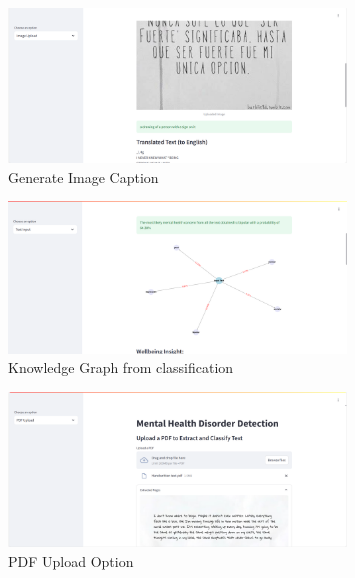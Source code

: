 \begin{figure}[h!]  
    \centering
    \includegraphics[width=0.8\textwidth]{App Images/18 Interface.png}  
    \caption{Generate Image Caption}
    \label{10i234}  %
\end{figure}   

\begin{figure}[h!]  
    \centering
    \includegraphics[width=0.8\textwidth]{App Images/19 Interface.png}  
    \caption{Knowledge Graph from classification}
    \label{10i23445}  %
\end{figure}  

\pagebreak

\begin{figure}[h!]  
    \centering
    \includegraphics[width=0.8\textwidth]{App Images/20 Interface.png}  
    \caption{PDF Upload Option}
    \label{10i23445}  %
\end{figure}  


